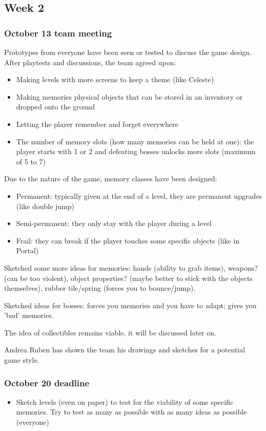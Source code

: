 \subsection{Week 2}

\subsubsection{October 13 team meeting}
Prototypes from everyone have been seen or tested to discuss the game design. After playtests and discussions, the team agreed upon:

\begin{itemize}
    \item Making levels with more screens to keep a theme (like Celeste)
    \item Making memories physical objects that can be stored in an inventory or dropped onto the ground
    \item Letting the player remember and forget everywhere
    \item The number of memory slots (how many memories can be held at one): the player starts with 1 or 2 and defeating bosses unlocks more slots (maximum of 5 to 7)
\end{itemize}

Due to the nature of the game, memory classes have been designed:
\begin{itemize}
    \item Permanent: typically given at the end of a level, they are permanent upgrades (like double jump)
    \item Semi-permanent: they only stay with the player during a level
    \item Frail: they can break if the player touches some specific objects (like in Portal)
\end{itemize}

Sketched some more ideas for memories: hands (ability to grab items), weapons? (can be too violent), object properties? (maybe better to stick with the objects themselves), rubber tile/spring (forces you to bounce/jump). \par
Sketched ideas for bosses: forces you memories and you have to adapt; gives you 'bad' memories. \par
The idea of collectibles remains viable, it will be discussed later on. \par
Andrea Ruben has shown the team his drawings and sketches for a potential game style.

\subsubsection{October 20 deadline}
\begin{itemize}
    \item Sketch levels (even on paper) to test for the viability of some specific memories. Try to test as many as possible with as many ideas as possible (everyone)
\end{itemize}